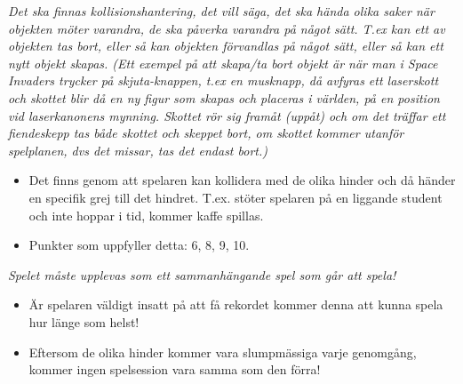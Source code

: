 \documentclass{template}
\begin{document}
\textit{Det ska finnas kollisionshantering, det vill säga, det ska hända olika saker när objekten möter varandra, de ska påverka varandra på något sätt. T.ex kan ett av objekten tas bort, eller så kan objekten förvandlas på något sätt, eller så kan ett nytt objekt skapas. (Ett exempel på att skapa/ta bort objekt är när man i Space Invaders trycker på skjuta-knappen, t.ex en musknapp, då avfyras ett laserskott och skottet blir då en ny figur som skapas och placeras i världen, på en position vid laserkanonens mynning. Skottet rör sig framåt (uppåt) och om det träffar ett fiendeskepp tas både skottet och skeppet bort, om skottet kommer utanför spelplanen, dvs det missar, tas det endast bort.)}
\begin{itemize}
    \item Det finns genom att spelaren kan kollidera med de olika hinder och då händer en specifik grej till det hindret. T.ex. stöter spelaren på en liggande student och inte hoppar i tid, kommer kaffe spillas.
    \item Punkter som uppfyller detta: 6, 8, 9, 10.
\end{itemize}
\textit{Spelet måste upplevas som ett sammanhängande spel som går att spela!}
\begin{itemize}
    \item Är spelaren väldigt insatt på att få rekordet kommer denna att kunna spela hur länge som helst!
    \item Eftersom de olika hinder kommer vara slumpmässiga varje genomgång, kommer ingen spelsession vara samma som den förra!
\end{itemize}
\end{document}
